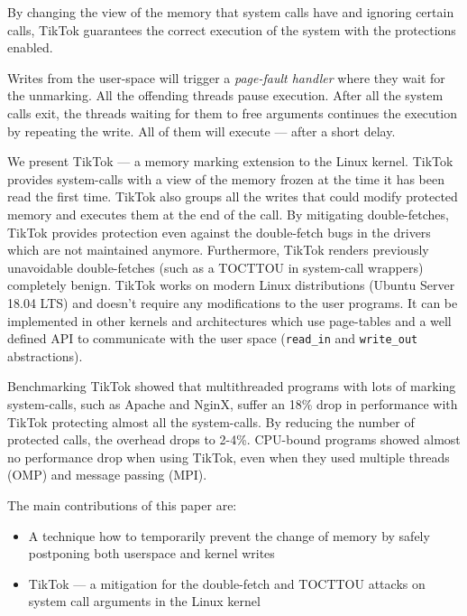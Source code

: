 \documentclass[conference]{IEEEtran}
\newcommand{\sysname}{TikTok}
\newcommand{\roughevaloverheadbad}{18\%}
\newcommand{\roughevaloverheadbetter}{2-4\%}
\begin{document}
By changing the view of the memory that system calls have and ignoring certain
calls, \sysname{} guarantees the correct execution of the system with the
protections enabled.

Writes from the user-space will trigger a \emph{page-fault handler} where they
wait for the unmarking. All the offending threads pause execution.
After all the system calls exit, the threads waiting for them to free arguments
continues the execution by repeating the write. All of them will execute 
--- after a short delay.

We present \sysname{} --- a memory marking extension to the Linux kernel. \sysname{}
provides system-calls with a view of the memory frozen at the time it
has been read the first time. \sysname{} also groups all the writes that could
modify protected memory and executes them at the end of the call. By mitigating
double-fetches, \sysname{} provides protection even against the double-fetch bugs
in the drivers which are not maintained anymore. Furthermore, \sysname{}
renders previously unavoidable double-fetches (such as a TOCTTOU in
system-call wrappers) completely benign. \sysname{} works on modern
Linux distributions (Ubuntu Server 18.04 LTS) and doesn't require any
modifications to the user programs. It can be implemented in other kernels
and architectures which use page-tables and a well defined API to communicate
with the user space (\texttt{read\_in} and \texttt{write\_out} abstractions).

Benchmarking \sysname{} showed that multithreaded programs with lots of marking
system-calls, such as Apache and NginX, suffer an \roughevaloverheadbad{} drop in
performance with \sysname{} protecting almost all the system-calls. By reducing
the number of protected calls, the overhead drops to \roughevaloverheadbetter{}.
CPU-bound programs showed almost no performance drop when using \sysname{}, even
when they used multiple threads (OMP) and message passing (MPI).



The main contributions of this paper are:


\begin{itemize}
\item A technique how to temporarily prevent the change of memory by safely
      postponing both userspace and kernel writes
\item \sysname{} --- a mitigation for the double-fetch and TOCTTOU attacks on system
      call arguments in the Linux kernel
\end{itemize}
\end{document}

